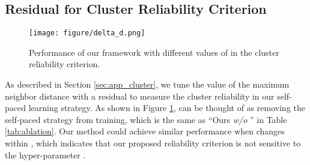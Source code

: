\documentclass{article}
\begin{document}
\subsection{Residual  for Cluster Reliability Criterion}


\begin{figure}[htb]
\centering
\texttt{[image: figure/delta\_d.png]}
\caption{Performance of our framework with different values of  in the cluster reliability criterion.}
\label{fig:delta_d}
\end{figure}

As described in Section \ref{sec:app_cluster},
we tune the value of the maximum neighbor distance  with a residual  to measure the cluster reliability in our self-paced learning strategy.
As shown in Figure \ref{fig:delta_d},
 can be thought of as removing the self-paced strategy from training, which is the same as ``Ours \textit{w/o} '' in Table \ref{tab:ablation}.
Our method could achieve similar performance when  changes within , which indicates that our proposed reliability criterion is not sensitive to the hyper-parameter .
\end{document}
